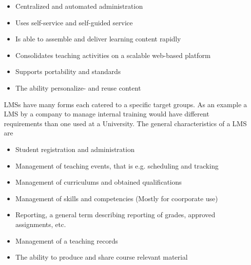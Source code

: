 \begin{itemize}
	\item Centralized and automated administration
	\item Uses self-service and self-guided service
	\item Is able to assemble and deliver learning content rapidly
	\item Consolidates teaching activities on a scalable web-based platform
	\item Supports portability and standards
	\item The ability personalize- and reuse content
\end{itemize}

LMSs have many forms each catered to a specific target groups. As an example a LMS by a company to manage internal training would have different requirements than one used at a University. The general characteristics of a LMS are~\citep{Kerschenbaum}
\begin{itemize}
	\item Student registration and administration
	\item Management of teaching events, that is e.g. scheduling and tracking
	\item Management of curriculums and obtained qualifications
	\item Management of skills and competencies (Mostly for coorporate use)
	\item Reporting, a general term describing reporting of grades, approved assignments, etc.
	\item Management of	a teaching records
	\item The ability to produce and share course relevant material

\end{itemize}


